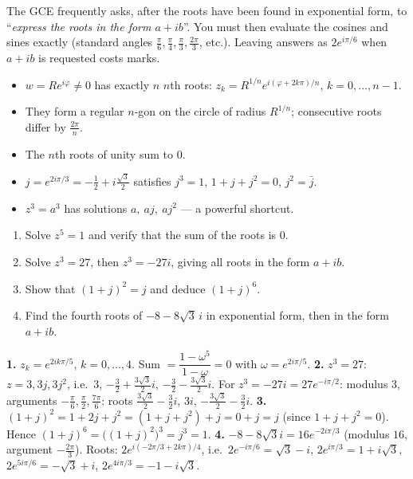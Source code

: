 \documentclass[11pt]{article}
\begin{document}
\begin{attention}
The GCE frequently asks, after the roots have been found in exponential form, to ``\emph{express the roots in the form $a + ib$}''. You must then evaluate the cosines and sines exactly (standard angles $\frac{\pi}{6}, \frac{\pi}{4}, \frac{\pi}{3}, \frac{2\pi}{3}$, etc.). Leaving answers as $2e^{i\pi/6}$ when $a + ib$ is requested costs marks.
\end{attention}

\begin{aretenir}
\begin{itemize}
\item $w = Re^{i\varphi} \neq 0$ has exactly $n$ $n$th roots: $z_k = R^{1/n} e^{i(\varphi + 2k\pi)/n}$, $k = 0, \dots, n-1$.
\item They form a regular $n$-gon on the circle of radius $R^{1/n}$; consecutive roots differ by $\frac{2\pi}{n}$.
\item The $n$th roots of unity sum to $0$.
\item $j = e^{2i\pi/3} = -\tfrac12 + i\tfrac{\sqrt3}{2}$ satisfies $j^3 = 1$, $1 + j + j^2 = 0$, $j^2 = \bar j$.
\item $z^3 = a^3$ has solutions $a,\ aj,\ aj^2$ — a powerful shortcut.
\end{itemize}
\end{aretenir}

\begin{exercice}[Practice]
\begin{enumerate}
\item Solve $z^5 = 1$ and verify that the sum of the roots is $0$.
\item Solve $z^3 = 27$, then $z^3 = -27i$, giving all roots in the form $a + ib$.
\item Show that $(1 + j)^2 = j$ and deduce $(1+j)^6$.
\item Find the fourth roots of $-8 - 8\sqrt{3}\,i$ in exponential form, then in the form $a + ib$.
\end{enumerate}
\end{exercice}

\begin{corrige}[Exercise 1]
\textbf{1.} $z_k = e^{2ik\pi/5}$, $k = 0,\dots,4$. Sum $= \dfrac{1 - \omega^5}{1 - \omega} = 0$ with $\omega = e^{2i\pi/5}$.
\textbf{2.} $z^3 = 27$: $z = 3, 3j, 3j^2$, i.e.\ $3$, $-\tfrac32 + \tfrac{3\sqrt3}{2}i$, $-\tfrac32 - \tfrac{3\sqrt3}{2}i$. For $z^3 = -27i = 27e^{-i\pi/2}$: modulus $3$, arguments $-\tfrac{\pi}{6}, \tfrac{\pi}{2}, \tfrac{7\pi}{6}$: roots $\tfrac{3\sqrt3}{2} - \tfrac32 i$, $3i$, $-\tfrac{3\sqrt3}{2} - \tfrac32 i$.
\textbf{3.} $(1+j)^2 = 1 + 2j + j^2 = (1 + j + j^2) + j = 0 + j = j$ (since $1+j+j^2=0$). Hence $(1+j)^6 = \big((1+j)^2\big)^3 = j^3 = 1$.
\textbf{4.} $-8 - 8\sqrt3 i = 16 e^{-2i\pi/3}$ (modulus $16$, argument $-\tfrac{2\pi}{3}$). Roots: $2e^{i(-2\pi/3 + 2k\pi)/4}$, i.e.\ $2e^{-i\pi/6} = \sqrt3 - i$, $2e^{i\pi/3} = 1 + i\sqrt3$, $2e^{5i\pi/6} = -\sqrt3 + i$, $2e^{4i\pi/3} = -1 - i\sqrt3$.
\end{corrige}
\end{document}
